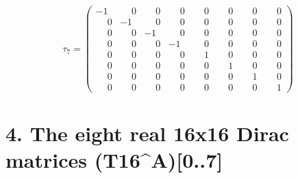 \documentclass[10pt]{article}
\begin{document}
\[
\tau_{7} = \left(\begin{smallmatrix}
-1 & \phantom{-}0 & \phantom{-}0 & \phantom{-}0 & \phantom{-}0 & \phantom{-}0 & \phantom{-}0 & \phantom{-}0 \\
\phantom{-}0 & -1 & \phantom{-}0 & \phantom{-}0 & \phantom{-}0 & \phantom{-}0 & \phantom{-}0 & \phantom{-}0 \\
\phantom{-}0 & \phantom{-}0 & -1 & \phantom{-}0 & \phantom{-}0 & \phantom{-}0 & \phantom{-}0 & \phantom{-}0 \\
\phantom{-}0 & \phantom{-}0 & \phantom{-}0 & -1 & \phantom{-}0 & \phantom{-}0 & \phantom{-}0 & \phantom{-}0 \\
\phantom{-}0 & \phantom{-}0 & \phantom{-}0 & \phantom{-}0 & \phantom{-}1 & \phantom{-}0 & \phantom{-}0 & \phantom{-}0 \\
\phantom{-}0 & \phantom{-}0 & \phantom{-}0 & \phantom{-}0 & \phantom{-}0 & \phantom{-}1 & \phantom{-}0 & \phantom{-}0 \\
\phantom{-}0 & \phantom{-}0 & \phantom{-}0 & \phantom{-}0 & \phantom{-}0 & \phantom{-}0 & \phantom{-}1 & \phantom{-}0 \\
\phantom{-}0 & \phantom{-}0 & \phantom{-}0 & \phantom{-}0 & \phantom{-}0 & \phantom{-}0 & \phantom{-}0 & \phantom{-}1
\end{smallmatrix}\right)
\]

\section*{4. The eight real 16x16 Dirac matrices (T16\^{}A)[0..7]}
\end{document}
